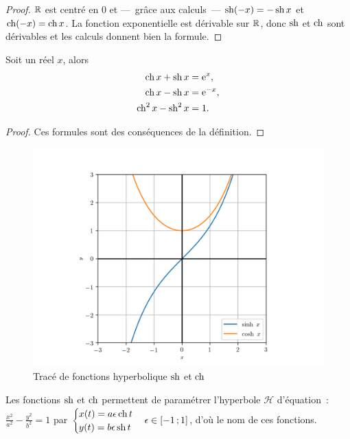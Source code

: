 \begin{proof}
  \(\mathbb{R}\) est centré en \(0\) et ---~grâce aux calculs~--- \(\operatorname{sh}(-x) = -\operatorname{sh}
  x\) et \(\operatorname{ch}(-x) = \operatorname{ch}{x}\). La fonction exponentielle est dérivable sur
  \(\mathbb{R}\), donc \(\operatorname{sh}\) et \(\operatorname{ch}\) sont dérivables et les calculs donnent
  bien la formule.
\end{proof}

\begin{prop} Soit un réel \(x\), alors
  \begin{align*}
    \operatorname{ch}{x}+\operatorname{sh}{x} &= \operatorname{e}^x, \\
    \operatorname{ch}{x}-\operatorname{sh}{x} &= \operatorname{e}^{-x}, \\
    \operatorname{ch}^2 x-\operatorname{sh}^2 x &= 1.
  \end{align*}
\end{prop}

\begin{proof}
  Ces formules sont des conséquences de la définition.
\end{proof}

\begin{figure}
  \centering
  \includegraphics[scale = 0.8]{trigh.png}
  \caption{Tracé de fonctions hyperbolique \(\operatorname{sh}\) et
  \(\operatorname{ch}\)}\label{fig:tracesinhcosh}
\end{figure}

Les fonctions \(\operatorname{sh}\) et \(\operatorname{ch}\) permettent de paramétrer l'hyperbole
\(\mathcal{H}\) d'équation~: \(\frac{x^2}{a^2} - \frac{y^2}{b^2} = 1\)  par
\(\begin{cases} x(t) = a \epsilon \operatorname{ch} t \\ y(t) = b \epsilon \operatorname{sh}
t\end{cases} \epsilon \in \left[ -1 \, ; {} 1 \right]\), d'où le nom de ces fonctions.

